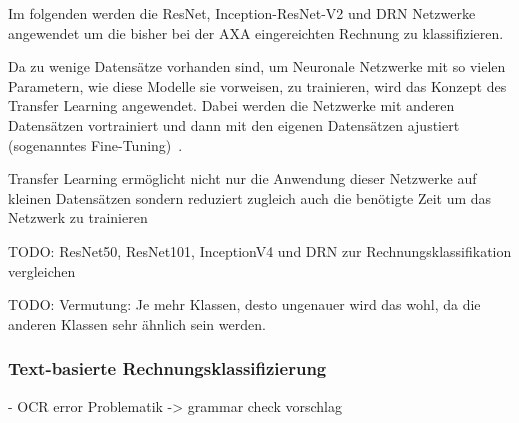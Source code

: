 


Im folgenden werden die ResNet, Inception-ResNet-V2 und DRN Netzwerke angewendet um die bisher bei der AXA eingereichten Rechnung zu klassifizieren.

Da zu wenige Datensätze vorhanden sind, um Neuronale Netzwerke mit so vielen Parametern, wie diese Modelle sie vorweisen, zu trainieren, wird das Konzept des Transfer Learning angewendet. Dabei werden die Netzwerke mit anderen Datensätzen vortrainiert und dann mit den eigenen Datensätzen ajustiert (sogenanntes Fine-Tuning)~\autocite{https://towardsdatascience.com/transfer-learning-from-pre-trained-models-f2393f124751}. 

Transfer Learning ermöglicht nicht nur die Anwendung dieser Netzwerke auf kleinen Datensätzen sondern reduziert zugleich auch die benötigte Zeit um das Netzwerk zu trainieren~\textcite{https://towardsdatascience.com/transfer-learning-from-pre-trained-models-f2393f124751}


TODO: ResNet50, ResNet101, InceptionV4 und DRN zur Rechnungsklassifikation vergleichen


TODO: Vermutung: Je mehr Klassen, desto ungenauer wird das wohl, da die anderen Klassen sehr ähnlich sein werden.

\subsubsection{Text-basierte Rechnungsklassifizierung}
\label{chap:text-based-classification}

- OCR error Problematik -> grammar check vorschlag

